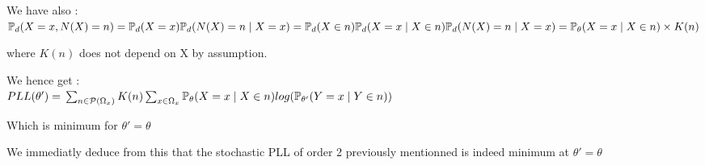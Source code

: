 \documentclass[11 pt]{article}
\begin{document}
		We have also : $\mathbb{P}_d(X = x, N(X) = n) = \mathbb{P}_d(X = x) \mathbb{P}_d(N(X) = n \mid X = x)  \\
		= \mathbb{P}_d(X \in n)  \mathbb{P}_d(X = x \mid X \in n)  \mathbb{P}_d(N(X) = n \mid X = x)  \\
		=  \mathbb{P}_{\theta}(X = x \mid X \in n) \times K(n)  \\
		$

		where $K(n)$ does not depend on X by assumption.

		We hence get : \\
		$ PLL(\theta')  =  \\
		\sum_{n \in \mathcal{P}(\Omega_x)} K(n) \sum_{x \in \Omega_x} \mathbb{P}_{\theta}(X = x \mid X \in n ) log (\mathbb{P}_{\theta '} (Y=x \mid Y \in n))
$

Which is minimum for $\theta' = \theta$


We immediatly deduce from this that the stochastic PLL of order 2 previously mentionned is indeed minimum at $\theta' = \theta$
\end{document}
